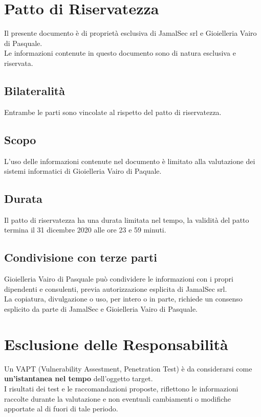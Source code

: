 \begin{cvletter}
   \color{black}
   \section{Patto di Riservatezza\ \color{gray}\vhrulefill{0.9pt}}
   Il presente documento è di proprietà esclusiva di JamalSec srl e Gioielleria Vairo di Pasquale.\\
   Le informazioni contenute in questo documento sono di natura esclusiva e riservata.
   \subsection{Bilateralità} 
   Entrambe le parti sono vincolate al rispetto del patto di riservatezza.
   \subsection{Scopo} 
   L'uso delle informazioni contenute nel documento è limitato alla valutazione dei sistemi informatici di Gioielleria Vairo di Paquale.
   \subsection{Durata} 
   Il patto di riservatezza ha una durata limitata nel tempo, la validità del patto termina il 31 dicembre 2020 alle ore 23 e 59 minuti.
   \subsection{Condivisione con terze parti} 
   Gioielleria Vairo di Pasquale può condividere le informazioni con i propri dipendenti e consulenti, previa autorizzazione esplicita di JamalSec srl.\\
   La copiatura, divulgazione o uso, per intero o in parte, richiede un consenso esplicito da parte di JamalSec e Gioielleria Vairo di Pasquale.\\

   \section{Esclusione delle Responsabilità\ \color{gray}\vhrulefill{0.9pt}}
   Un VAPT (Vulnerability Assestment, Penetration Test) è da considerarsi come \textbf{un’istantanea nel tempo} dell’oggetto target.\\
   I risultati dei test e le raccomandazioni proposte, riflettono le informazioni raccolte durante la valutazione e non eventuali cambiamenti o modifiche apportate al di fuori di tale periodo.\\


\end{cvletter}
